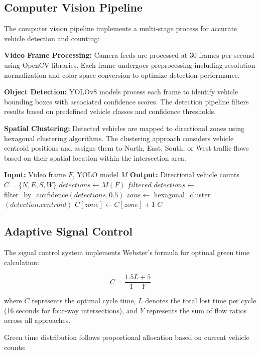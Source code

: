 \documentclass[conference]{IEEEtran}
\begin{document}
\subsection{Computer Vision Pipeline}

The computer vision pipeline implements a multi-stage process for accurate vehicle detection and counting:

\textbf{Video Frame Processing:} Camera feeds are processed at 30 frames per second using OpenCV libraries. Each frame undergoes preprocessing including resolution normalization and color space conversion to optimize detection performance.

\textbf{Object Detection:} YOLOv8 models process each frame to identify vehicle bounding boxes with associated confidence scores. The detection pipeline filters results based on predefined vehicle classes and confidence thresholds.

\textbf{Spatial Clustering:} Detected vehicles are mapped to directional zones using hexagonal clustering algorithms. The clustering approach considers vehicle centroid positions and assigns them to North, East, South, or West traffic flows based on their spatial location within the intersection area.

\begin{algorithmic}
\STATE \textbf{Input:} Video frame $F$, YOLO model $M$
\STATE \textbf{Output:} Directional vehicle counts $C = \{N, E, S, W\}$
\STATE $detections \leftarrow M(F)$
\STATE $filtered\_detections \leftarrow$ filter\_by\_confidence$(detections, 0.5)$
    \STATE $zone \leftarrow$ hexagonal\_cluster$(detection.centroid)$
    \STATE $C[zone] \leftarrow C[zone] + 1$
\ENDFOR
\RETURN $C$
\end{algorithmic}

\subsection{Adaptive Signal Control}

The signal control system implements Webster's formula for optimal green time calculation:

$$C = \frac{1.5L + 5}{1 - Y}$$

where $C$ represents the optimal cycle time, $L$ denotes the total lost time per cycle (16 seconds for four-way intersections), and $Y$ represents the sum of flow ratios across all approaches.

Green time distribution follows proportional allocation based on current vehicle counts:
\end{document}
